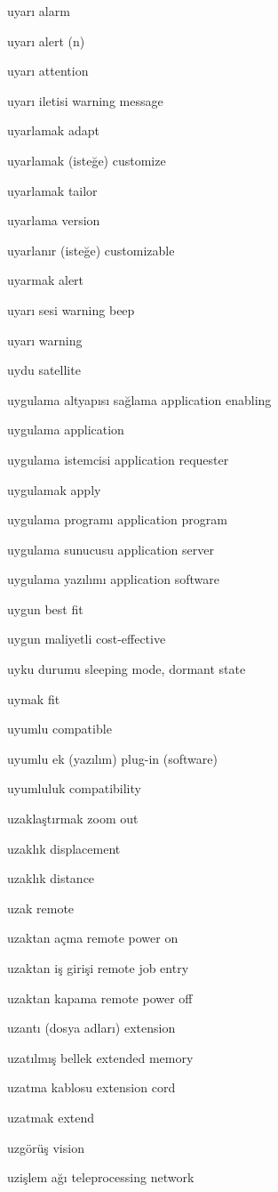 \documentclass[12pt,fleqn]{article}\usepackage{../../common}
\begin{document}
uyarı alarm

uyarı alert (n)

uyarı attention

uyarı iletisi warning message

uyarlamak adapt

uyarlamak (isteğe) customize

uyarlamak tailor

uyarlama version

uyarlanır (isteğe) customizable

uyarmak alert

uyarı sesi warning beep

uyarı warning

uydu satellite

uygulama altyapısı sağlama application enabling

uygulama application

uygulama istemcisi application requester

uygulamak apply

uygulama programı application program

uygulama sunucusu application server

uygulama yazılımı application software

uygun best fit

uygun maliyetli cost-effective

uyku durumu sleeping mode, dormant state

uymak fit

uyumlu compatible

uyumlu ek (yazılım) plug-in (software)

uyumluluk compatibility

uzaklaştırmak zoom out

uzaklık displacement

uzaklık distance

uzak remote

uzaktan açma remote power on

uzaktan iş girişi remote job entry

uzaktan kapama remote power off

uzantı (dosya adları) extension

uzatılmış bellek extended memory

uzatma kablosu extension cord

uzatmak extend

uzgörüş vision

uzişlem ağı teleprocessing network
\end{document}
